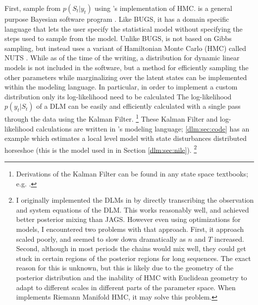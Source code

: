 First, sample from $p(S_{t} | y_{t})$ using \Stan{}'s implementation of HMC.
\Stan{} is a general purpose Bayesian software program \parencite{Stan2013b}.
Like BUGS, it has a domain specific language that lets the user specify the statistical model without specifying the steps used to sample from the model.
Unlike BUGS, \Stan{} is not based on Gibbs sampling, but instead uses a variant of Hamiltonian Monte Carlo (HMC) called NUTS \parencite{HoffmanGelman2013}.
While as of the time of the writing, a distribution for dynamic linear models is not included in the software, but a method for efficiently sampling the other parameters while marginalizing over the latent states can be implemented within the \Stan{} modeling language.
In particular, in order to implement a custom distribution only its log-likelihood need to be calculated \parencite[Chapter 17]{Stan2013}
The log-likelihood $p(y_{t} | S_{t})$ of a DLM can be easily and efficiently calculated with a single pass through the data using the Kalman Filter.%
\footnote{Derivations of the Kalman Filter can be found in any state space textbooks; e.g. \textcite{DurbinKoopman2001}.}
These Kalman Filter and log-likelihood calculations are written in \Stan{}'s modeling language;
\ref{dlm:sec:code} has an example which estimates a local level model with state disturbances distributed horseshoe (this is the model used in  in Section \ref{dlm:sec:nile}).
\footnote{
  I originally implemented the DLMs in \Stan{} by directly transcribing the observation and system equations of the DLM.
  This works reasonably well, and \Stan{} achieved better posterior mixing than JAGS.
  However even using optimizations for \Stan{} models, I encountered two problems with that approach.
  First, it approach scaled poorly, and seemed to slow down dramatically as $n$ and $T$ increased.
  Second, although in most periods the chains would mix well, they could get stuck in certain regions of the posterior regions for long sequences.
  The exact reason for this is unknown, but this is likely due to the geometry of the posterior distribution and the inability of HMC with Euclidean geometry to adapt to different scales in different parts of the parameter space.
  When \Stan{} implements Riemann Manifold HMC, it may solve this problem.
}

